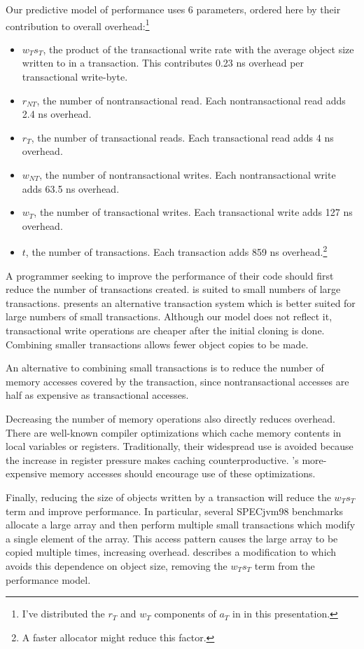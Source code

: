 Our predictive model of \apex performance uses 6 parameters, ordered here
by their contribution to overall overhead:\footnote{I've distributed
  the $r_T$ and $w_T$ components of $a_T$ in  in this
  presentation.}
\begin{itemize}
\item $w_T s_T$, the product of the transactional write rate with the
  average object size written to in a transaction.  This contributes
  0.23 ns overhead per transactional write-byte.
\item $r_{NT}$, the number of nontransactional read.  Each
  nontransactional read adds 2.4 ns overhead.
\item $r_T$, the number of transactional reads.  Each transactional
  read adds 4 ns overhead.
\item $w_{NT}$, the number of nontransactional writes.  Each
  nontransactional write adds 63.5 ns overhead.
\item $w_T$, the number of transactional writes.  Each transactional
  write adds 127 ns overhead.
\item $t$, the number of transactions.  Each transaction adds 859 ns
  overhead.\footnote{A faster allocator might reduce this factor.}
\end{itemize}

A programmer seeking to improve the performance of their code should
first reduce the number of transactions created.  \apex is suited to
small numbers of large transactions.  
presents an alternative transaction system which is better suited for large
numbers of small transactions. 
Although our model does not reflect it, transactional write operations
are cheaper after the initial cloning is done.  Combining smaller
transactions allows fewer object copies to be made.

An alternative to combining small transactions is to reduce the number
of memory accesses covered by the transaction, since nontransactional
accesses are half as expensive as transactional accesses.

Decreasing the number of memory operations also directly reduces overhead.
There are well-known compiler optimizations which
cache memory contents in local variables or registers.  Traditionally,
their widespread use is avoided because the increase in register
pressure makes caching counterproductive.  \apex's more-expensive
memory accesses should encourage use of these optimizations.

Finally, reducing the size of objects written by a transaction will
reduce the $w_T s_T$ term and improve performance.  In particular,
several SPECjvm98 benchmarks allocate a large array and then perform
multiple small transactions which modify a single element of the
array.  This access pattern causes the large array to be copied
multiple times, increasing overhead.   describes a
modification to \apex which avoids this dependence on object size,
removing the $w_T s_T$ term from the performance model.

